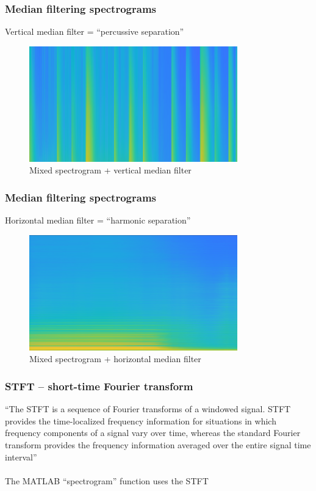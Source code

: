 \documentclass{beamer}
\begin{document}
\begin{frame}
	\frametitle{Median filtering spectrograms}
	Vertical median filter = ``percussive separation''
	\begin{figure}
	\includegraphics[height=5cm]{../images/medfilter_axis1.png}
		\caption{Mixed spectrogram + vertical median filter}
	\end{figure}
\end{frame}

\begin{frame}
	\frametitle{Median filtering spectrograms}
	Horizontal median filter = ``harmonic separation''
	\begin{figure}
	\includegraphics[height=5cm]{../images/medfilter_axis2.png}
		\caption{Mixed spectrogram + horizontal median filter}
	\end{figure}
\end{frame}

\begin{frame}
	\frametitle{STFT -- short-time Fourier transform}
	``The STFT is a sequence of Fourier transforms of a windowed signal. STFT provides the time-localized frequency information for situations in which frequency components of a signal vary over time, whereas the standard Fourier transform provides the frequency information averaged over the entire signal time interval'' \\\ \\
	The MATLAB ``spectrogram'' function uses the STFT 
\end{frame}
\end{document}
